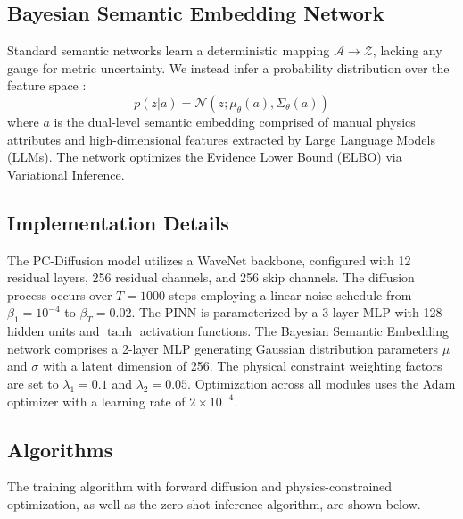 \documentclass[journal]{IEEEtran}
\begin{document}
\subsection{Bayesian Semantic Embedding Network}
Standard semantic networks learn a deterministic mapping $\mathcal{A} \rightarrow \mathcal{Z}$, lacking any gauge for metric uncertainty. We instead infer a probability distribution over the feature space \cite{blundell2015weight,jordan1999introduction}:
\begin{equation}
    p(z|a) = \mathcal{N}(z; \mu_\theta(a), \Sigma_\theta(a))
\end{equation}
where $a$ is the dual-level semantic embedding comprised of manual physics attributes and high-dimensional features extracted by Large Language Models (LLMs). The network optimizes the Evidence Lower Bound (ELBO) via Variational Inference.

\subsection{Implementation Details}
The PC-Diffusion model utilizes a WaveNet backbone, configured with 12 residual layers, 256 residual channels, and 256 skip channels. The diffusion process occurs over $T = 1000$ steps employing a linear noise schedule from $\beta_1 = 10^{-4}$ to $\beta_T = 0.02$. The PINN is parameterized by a 3-layer MLP with 128 hidden units and $\tanh$ activation functions. The Bayesian Semantic Embedding network comprises a 2-layer MLP generating Gaussian distribution parameters $\mu$ and $\sigma$ with a latent dimension of 256. The physical constraint weighting factors are set to $\lambda_1 = 0.1$ and $\lambda_2 = 0.05$. Optimization across all modules uses the Adam optimizer with a learning rate of $2 \times 10^{-4}$.

\subsection{Algorithms}
The training algorithm with forward diffusion and physics-constrained optimization, as well as the zero-shot inference algorithm, are shown below.
\end{document}
